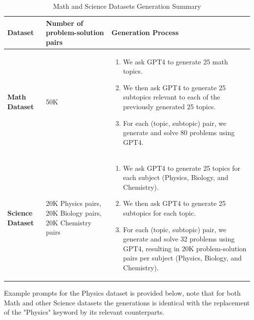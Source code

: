 \begin{table}[htbp]
	\centering
	\caption{Math and Science Datasets Generation Summary}
	\label{tab:summary}
	\begin{tabular}{p{2cm}p{5cm}p{5cm}}
		\toprule
		\textbf{Dataset}         & \textbf{Number of problem-solution pairs}                 & \textbf{Generation Process} \\
		\midrule
		\textbf{Math Dataset}    & 50K                                                       &
		\begin{enumerate}[leftmargin=0.5cm]
			\item We ask GPT4 to generate 25 math topics.
			\item We then ask GPT4 to generate 25 subtopics relevant to each of the previously generated 25 topics.
			\item For each (topic, subtopic) pair, we generate and solve 80 problems using GPT4.
		\end{enumerate}                                                                                         \\
		\midrule
		\textbf{Science Dataset} & 20K Physics pairs, 20K Biology pairs, 20K Chemistry pairs &
		\begin{enumerate}[leftmargin=0.5cm]
			\item We ask GPT4 to generate 25 topics for each subject (Physics, Biology, and Chemistry).
			\item We then ask GPT4 to generate 25 subtopics for each topic.
			\item For each (topic, subtopic) pair, we generate and solve 32 problems using GPT4, resulting in 20K problem-solution pairs per subject (Physics, Biology, and Chemistry).
		\end{enumerate}                                                                                         \\
		\bottomrule
	\end{tabular}
\end{table}

\clearpage 
Example prompts for the Physics dataset is provided below, note that for both Math and other Science datasets the generations is identical with the replacement of the "Physics" keyword by its relevant counterparts.

